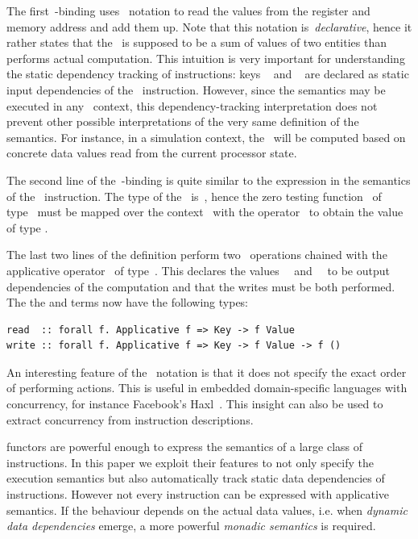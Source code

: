 The first~-binding uses~ notation to read the values
from the register  and memory address  and add them up. Note
that this notation is~\emph{declarative}, hence it rather states that
the~ is supposed to be a sum of values of two entities than performs
actual computation. This intuition is very important for understanding the
static dependency tracking of instructions: keys ~ and
~ are declared as static input dependencies of the~
instruction. However, since the semantics may be executed in
any~ context, this dependency-tracking interpretation does not
prevent other possible interpretations of the very same definition of the
semantics. For instance, in a simulation context, the~ will be
computed based on concrete data values read from the current processor state.

The second line of the~-binding is quite similar to the expression in the
semantics of the~ instruction. The type of the~ is~,
hence the zero testing function~ of type~
must be mapped over the context~ with the operator~\hs{<$>} to obtain the
value of type .

The last two lines of the definition perform two~ operations chained
with the applicative operator~\hs{*>} of
type~.
This declares the values~~ and~~ to be output
dependencies of the computation and that the writes must be both performed.
The the  and  terms now have the following types:

\begin{verbatim}
read  :: forall f. Applicative f => Key -> f Value
write :: forall f. Applicative f => Key -> f Value -> f ()
\end{verbatim}

An interesting feature of the~ notation is that it does not
specify the exact order of performing actions. This is useful in
embedded domain-specific languages with concurrency, for instance
Facebook's Haxl~\cite{Marlow:2014:NFA:2692915.2628144}. This insight can also
be used to extract concurrency from instruction descriptions.

 functors are powerful enough to express the semantics of a
large class of instructions. In this paper we exploit their features to not only
specify the execution semantics but also automatically track static data dependencies
of instructions. However not every instruction can be expressed with applicative
semantics. If the behaviour depends on the actual data values,
i.e. when \emph{dynamic data dependencies} emerge, a more powerful
\emph{monadic semantics} is required.

